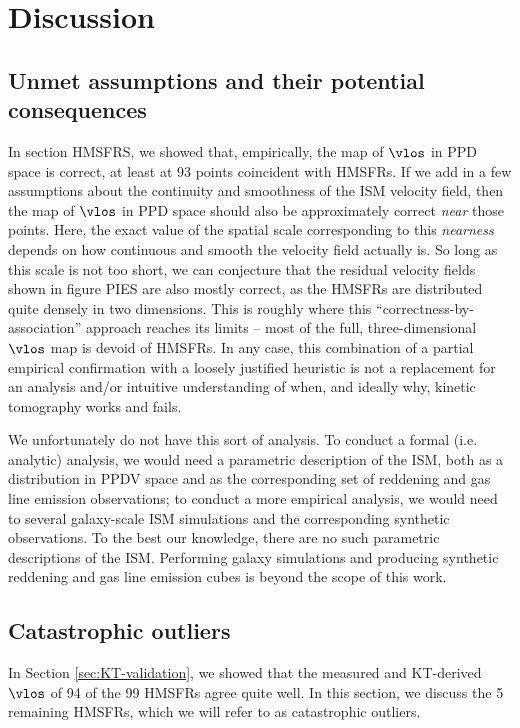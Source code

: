 \section{Discussion}
\label{sec:discussion}

\subsection{Unmet assumptions and their potential consequences}
\label{sec:discussion-systematics}
In section HMSFRS, we showed that, empirically, the map of $\vlos$ in PPD space is correct, at least at 93 points coincident with HMSFRs. 
If we add in a few assumptions about the continuity and smoothness of the ISM velocity field, then the map of $\vlos$ in PPD space should also be approximately correct \emph{near} those points. 
Here, the exact value of the spatial scale corresponding to this \emph{nearness} depends on how continuous and smooth the velocity field actually is.
So long as this scale is not too short, we can conjecture that the residual velocity fields shown in figure PIES are also mostly correct, as the HMSFRs are distributed quite densely in two dimensions. 
This is roughly where this ``correctness-by-association'' approach reaches its limits -- most of the full, three-dimensional $\vlos$ map is devoid of HMSFRs.
In any case, this combination of a partial empirical confirmation with a loosely justified heuristic is not a replacement for an analysis and/or intuitive understanding of when, and ideally why, kinetic tomography works and fails.

We unfortunately do not have this sort of analysis. 
To conduct a formal (i.e. analytic) analysis, we would need a parametric description of the ISM, both as a distribution in PPDV space and as the corresponding set of reddening and gas line emission observations; to conduct a more empirical analysis, we would need to several galaxy-scale ISM simulations and the corresponding synthetic observations. 
To the best our knowledge, there are no such parametric descriptions of the ISM.
Performing galaxy simulations and producing synthetic reddening and gas line emission cubes is beyond the scope of this work.


\subsection{Catastrophic outliers}
\label{sec:discussion-catastrophic}
In Section \ref{sec:KT-validation}, we showed that the measured and KT-derived $\vlos$ of 94 of the 99 \Reid HMSFRs agree quite well. 
In this section, we discuss the 5 remaining HMSFRs, which we will refer to as catastrophic outliers.

